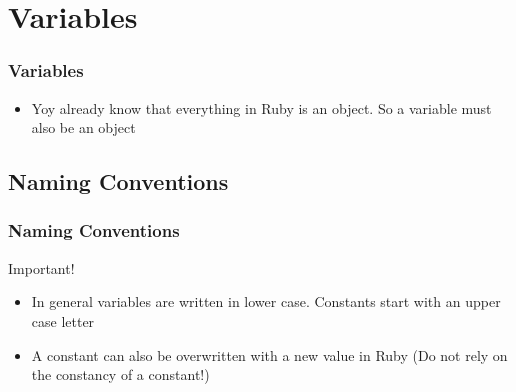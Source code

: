 \documentclass{beamer}
\begin{document}
\section{Variables}
\begin{frame}[fragile]
\frametitle{Variables}
\begin{itemize}
 \item Yoy already know that everything in Ruby is an object. So a variable must also be an object
\end{itemize}

\end{frame}
\subsection{Naming Conventions}
\begin{frame}[fragile]
\frametitle{Naming Conventions}
\begin{block}{Important!}
\begin{itemize}
  \item In general variables are written in lower case. Constants start with an upper case letter
  \item A constant can also be overwritten with a new value in Ruby (Do not rely on the constancy of a constant!)
\end{itemize}

\end{block}

\end{frame}
\end{document}
